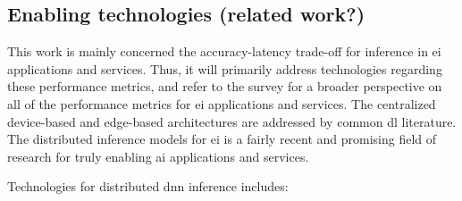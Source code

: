 \subsection{Enabling technologies (related work?)}

This work is mainly concerned the accuracy-latency trade-off for inference in \gls{ei} applications and services. Thus, it will primarily address technologies regarding these performance metrics, and refer to the survey for a broader perspective on all of the performance metrics for \gls{ei} applications and services. The centralized device-based and edge-based architectures are addressed by common \gls{dl} literature. The distributed inference models for \gls{ei} is a fairly recent and promising field of research for truly enabling \gls{ai} applications and services.

Technologies for distributed \gls{dnn} inference includes:

